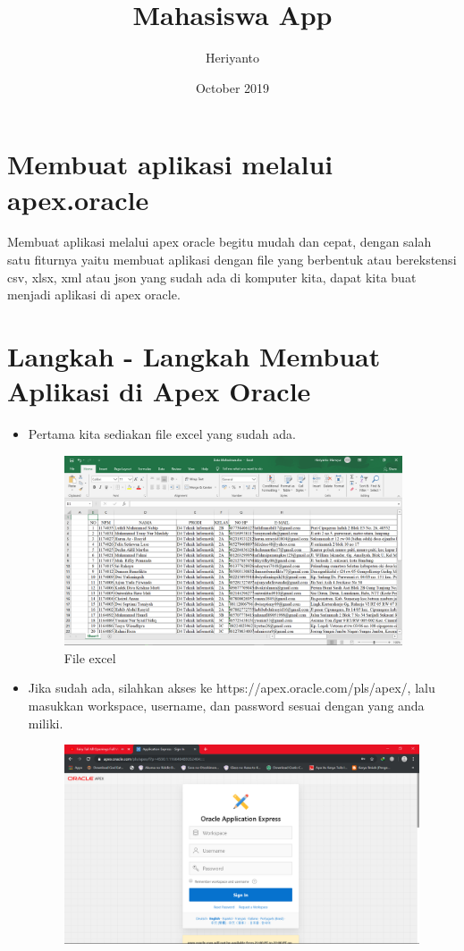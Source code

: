 \documentclass[12pt, times new roman]{article}
\title{Mahasiswa App}
\author{Heriyanto}
\date{October 2019}
\begin{document}
\maketitle
\section{Membuat aplikasi melalui apex.oracle}
Membuat aplikasi melalui apex oracle begitu mudah dan cepat, dengan salah satu fiturnya yaitu membuat aplikasi dengan file yang berbentuk atau berekstensi csv, xlsx, xml atau json yang sudah ada di komputer kita, dapat kita buat menjadi aplikasi di apex oracle.
\section{Langkah - Langkah Membuat Aplikasi di Apex Oracle}
\begin{itemize}
\item Pertama kita sediakan file excel yang sudah ada.
\begin{figure}[htbp]
	\centering
	\includegraphics[width=10cm]{figures/1.png}
	\caption{File excel}
\end{figure}
\item Jika sudah ada, silahkan akses ke https://apex.oracle.com/pls/apex/, lalu masukkan workspace, username, dan password sesuai dengan yang anda miliki.
\begin{figure}[htbp]
	\centering
	\includegraphics[width=10.5cm]{figures/2.png}

\end{figure}
\end{itemize}
\end{document}
